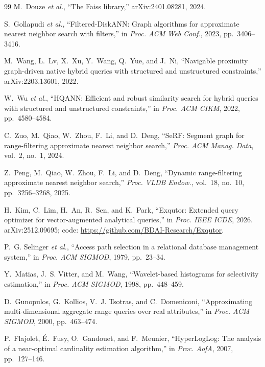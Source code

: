 \documentclass[sigconf,nonacm]{acmart}
\begin{document}
\begin{thebibliography}{99}
M.~Douze \emph{et al.}, ``The Faiss library,'' arXiv:2401.08281, 2024.

S.~Gollapudi \emph{et al.}, ``Filtered-DiskANN: Graph algorithms for approximate nearest neighbor search with filters,'' in \emph{Proc. ACM Web Conf.}, 2023, pp.~3406--3416.

M.~Wang, L.~Lv, X.~Xu, Y.~Wang, Q.~Yue, and J.~Ni, ``Navigable proximity graph-driven native hybrid queries with structured and unstructured constraints,'' arXiv:2203.13601, 2022.

W.~Wu \emph{et al.}, ``HQANN: Efficient and robust similarity search for hybrid queries with structured and unstructured constraints,'' in \emph{Proc. ACM CIKM}, 2022, pp.~4580--4584.

C.~Zuo, M.~Qiao, W.~Zhou, F.~Li, and D.~Deng, ``SeRF: Segment graph for range-filtering approximate nearest neighbor search,'' \emph{Proc. ACM Manag. Data}, vol.~2, no.~1, 2024.

Z.~Peng, M.~Qiao, W.~Zhou, F.~Li, and D.~Deng, ``Dynamic range-filtering approximate nearest neighbor search,'' \emph{Proc. VLDB Endow.}, vol.~18, no.~10, pp.~3256--3268, 2025.

H.~Kim, C.~Lim, H.~An, R.~Sen, and K.~Park, ``Exqutor: Extended query optimizer for vector-augmented analytical queries,'' in \emph{Proc. IEEE ICDE}, 2026. arXiv:2512.09695; code: \url{https://github.com/BDAI-Research/Exqutor}.

P.~G. Selinger \emph{et al.}, ``Access path selection in a relational database management system,'' in \emph{Proc. ACM SIGMOD}, 1979, pp.~23--34.

Y.~Matias, J.~S. Vitter, and M.~Wang, ``Wavelet-based histograms for selectivity estimation,'' in \emph{Proc. ACM SIGMOD}, 1998, pp.~448--459.

D.~Gunopulos, G.~Kollios, V.~J. Tsotras, and C.~Domeniconi, ``Approximating multi-dimensional aggregate range queries over real attributes,'' in \emph{Proc. ACM SIGMOD}, 2000, pp.~463--474.

P.~Flajolet, {\'E}.~Fusy, O.~Gandouet, and F.~Meunier, ``HyperLogLog: The analysis of a near-optimal cardinality estimation algorithm,'' in \emph{Proc. AofA}, 2007, pp.~127--146.


\end{thebibliography}
\end{document}
